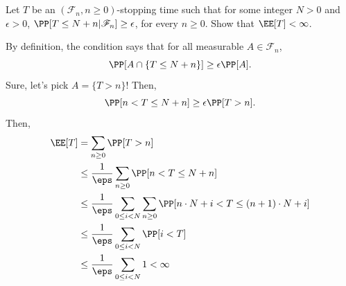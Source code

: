 \documentclass[11pt, headheight=30pt]{scrartcl}
\begin{document}
\section{}
\begin{prob*}
    Let $T$ be an $(\mathscr{F}_n, n \geq 0)$-stopping time such that for some integer $N > 0$ and $\epsilon > 0$,
    $\PP[T \leq N + n | \mathscr{F}_n] \geq \epsilon$, for every $n \geq 0$.
    Show that $\EE[T] < \infty$.
\end{prob*}
By definition, the condition says that for all measurable $A\in \mathscr{F}_n$,
\[
    \PP[A \cap \{T \leq N + n\}] \geq \epsilon \PP[A].
\]
Sure, let's pick $A = \{T > n\}$! Then,
\[
    \PP[n < T \leq N + n] \geq \epsilon \PP[T > n].
\]
Then,
\begin{align*}
    \EE[T] &= \sum_{n\geq 0} \PP[T > n]\\
    &\leq \frac{1}{\eps}\sum_{n\geq 0} \PP[n < T \leq N + n]\\
    &\leq \frac{1}{\eps}\sum_{0\leq i < N} \sum_{n\geq 0} \PP[n\cdot N + i < T \leq (n+1)\cdot N + i]\\
    &\leq \frac{1}{\eps}\sum_{0\leq i < N} \PP[i < T]\\
    &\leq \frac{1}{\eps}\sum_{0\leq i < N} 1 < \infty
\end{align*}

\end{document}
